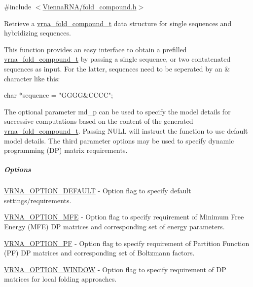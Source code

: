 {\ttfamily \#include $<$\hyperlink{fold__compound_8h}{Vienna\+R\+N\+A/fold\+\_\+compound.\+h}$>$}



Retrieve a \hyperlink{group__fold__compound_ga1b0cef17fd40466cef5968eaeeff6166}{vrna\+\_\+fold\+\_\+compound\+\_\+t} data structure for single sequences and hybridizing sequences. 

This function provides an easy interface to obtain a prefilled \hyperlink{group__fold__compound_ga1b0cef17fd40466cef5968eaeeff6166}{vrna\+\_\+fold\+\_\+compound\+\_\+t} by passing a single sequence, or two contatenated sequences as input. For the latter, sequences need to be seperated by an \textquotesingle{}\&\textquotesingle{} character like this\+:\begin{DoxyVerb}char *sequence = "GGGG&CCCC"; \end{DoxyVerb}


The optional parameter {\ttfamily md\+\_\+p} can be used to specify the model details for successive computations based on the content of the generated \hyperlink{group__fold__compound_ga1b0cef17fd40466cef5968eaeeff6166}{vrna\+\_\+fold\+\_\+compound\+\_\+t}. Passing N\+U\+LL will instruct the function to use default model details. The third parameter {\ttfamily options} may be used to specify dynamic programming (DP) matrix requirements.

\subparagraph*{Options}


\begin{DoxyItemize}
\item \hyperlink{group__fold__compound_gacea5b7ee6181c485f36e2afa0e9089e4}{V\+R\+N\+A\+\_\+\+O\+P\+T\+I\+O\+N\+\_\+\+D\+E\+F\+A\+U\+LT} -\/ Option flag to specify default settings/requirements.
\item \hyperlink{group__fold__compound_gae63be9127fe7dcc1f9bb14f5bb1064ee}{V\+R\+N\+A\+\_\+\+O\+P\+T\+I\+O\+N\+\_\+\+M\+FE} -\/ Option flag to specify requirement of Minimum Free Energy (M\+FE) DP matrices and corresponding set of energy parameters.
\item \hyperlink{group__fold__compound_gabfbadcddda3e74ce7f49035ef8f058f7}{V\+R\+N\+A\+\_\+\+O\+P\+T\+I\+O\+N\+\_\+\+PF} -\/ Option flag to specify requirement of Partition Function (PF) DP matrices and corresponding set of Boltzmann factors.
\item \hyperlink{group__fold__compound_ga2b2a8009ccdccc3eb1571556261aee8e}{V\+R\+N\+A\+\_\+\+O\+P\+T\+I\+O\+N\+\_\+\+W\+I\+N\+D\+OW} -\/ Option flag to specify requirement of DP matrices for local folding approaches.
\end{DoxyItemize}

